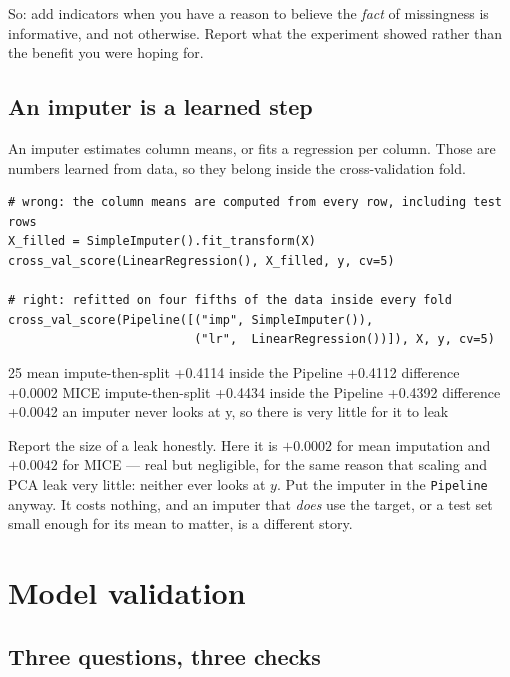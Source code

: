 \documentclass[11pt]{article}
\begin{document}
So: add indicators when you have a reason to believe the \emph{fact} of
missingness is informative, and not otherwise. Report what the experiment
showed rather than the benefit you were hoping for.

\subsection{An imputer is a learned step}

An imputer estimates column means, or fits a regression per column. Those are
numbers learned from data, so they belong inside the cross-validation fold.

\begin{lstlisting}
# wrong: the column means are computed from every row, including test rows
X_filled = SimpleImputer().fit_transform(X)
cross_val_score(LinearRegression(), X_filled, y, cv=5)

# right: refitted on four fifths of the data inside every fold
cross_val_score(Pipeline([("imp", SimpleImputer()),
                          ("lr",  LinearRegression())]), X, y, cv=5)
\end{lstlisting}
\begin{codeout}
25%
   mean    impute-then-split +0.4114   inside the Pipeline +0.4112   difference +0.0002
   MICE    impute-then-split +0.4434   inside the Pipeline +0.4392   difference +0.0042
   an imputer never looks at y, so there is very little for it to leak
\end{codeout}

\begin{keyidea}
Report the size of a leak honestly. Here it is $+0.0002$ for mean imputation
and $+0.0042$ for MICE --- real but negligible, for the same reason that
scaling and PCA leak very little: neither ever looks at $y$. Put the imputer
in the \texttt{Pipeline} anyway. It costs nothing, and an imputer that
\emph{does} use the target, or a test set small enough for its mean to matter,
is a different story.
\end{keyidea}

\notesources{\AMLUnitVSources}

\section{Model validation}
\label{sec:valid}

\subsection{Three questions, three checks}
\end{document}

